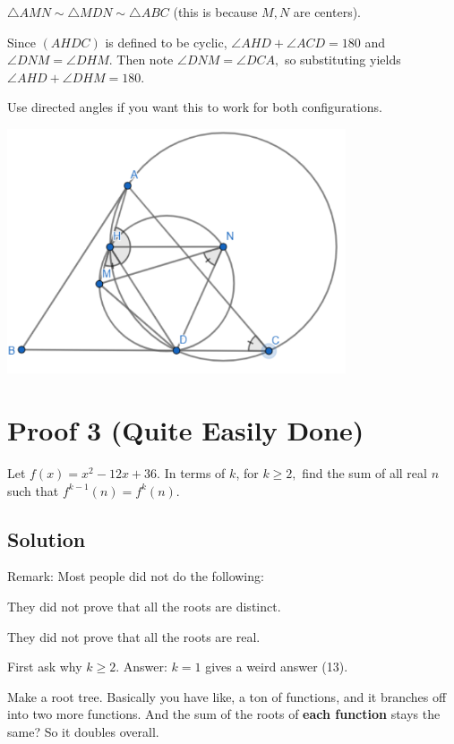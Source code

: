 \documentclass{article}
\begin{document}
$\triangle AMN\sim \triangle MDN\sim \triangle ABC$ (this is because $M,N$ are centers).

Since $(AHDC)$ is defined to be cyclic, $\angle AHD+\angle ACD=180$ and $\angle DNM=\angle DHM.$ Then note $\angle DNM=\angle DCA,$ so substituting yields $\angle AHD+\angle DHM=180.$

Use directed angles if you want this to work for both configurations.

\includegraphics[width=10cm]{proof2.png}

\pagebreak\section{Proof 3 (Quite Easily Done)}

Let $f(x)=x^2-12x+36.$ In terms of $k$, for $k\geq 2,$ find the sum of all real $n$ such that $f^{k-1}(n)=f^k(n).$

\subsection{Solution}

Remark: Most people did not do the following:

\begin{itemize}
	\Item They did not prove that all the roots are distinct.
	
	\Item They did not prove that all the roots are real.
\end{itemize}

First ask why $k\geq 2.$ Answer: $k=1$ gives a weird answer (13).

Make a root tree. Basically you have like, a ton of functions, and it branches off into two more functions. And the sum of the roots of \textbf{each function} stays the same? So it doubles overall.
\end{document}
